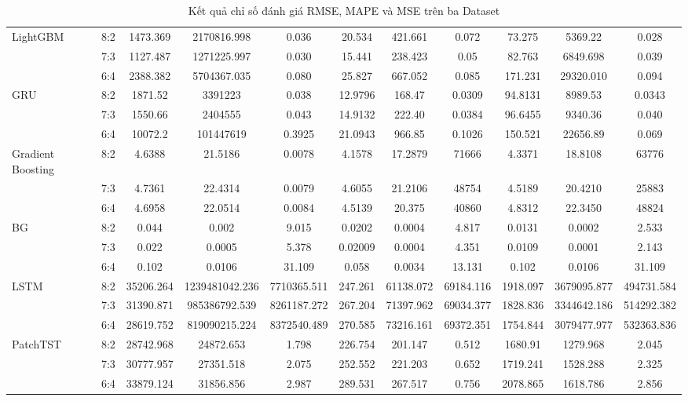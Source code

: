 \documentclass[conference]{IEEEtran}
\begin{document}
\begin{minipage}{1\textwidth}
\begin{table}[H]
\begin{tabular}{|l|c||c||c||c||c||c||c||c||c||c|}
\hline
LightGBM & 8:2 & 1473.369 & 2170816.998 & 0.036 & 20.534 & 421.661 & 0.072 & 73.275 & 5369.22 & 0.028  \\
    & 7:3 & 1127.487 & 1271225.997 & 0.030 & 15.441 & 238.423 & 0.05 & 82.763 & 6849.698 & 0.039  \\
    & 6:4 & 2388.382 & 5704367.035 & 0.080 & 25.827 & 667.052 & 0.085 & 171.231 & 29320.010 & 0.094  \\
\hline
GRU & 8:2 &1871.52  &3391223  &0.038 &12.9796 &168.47 &0.0309 &94.8131 &8989.53 &0.0343 \\
    & 7:3 &1550.66  &2404555  &0.043 &14.9132 &222.40 &0.0384 &96.6455 &9340.36 &0.040 \\
    & 6:4 &10072.2  &101447619  &0.3925 &21.0943 &966.85 &0.1026 &150.521 &22656.89 &0.069 \\
\hline
Gradient Boosting & 8:2 &4.6388  &21.5186  &0.0078 &4.1578 &17.2879 &71666 &4.3371 &18.8108 &63776 \\
    & 7:3 &4.7361  &22.4314  &0.0079 &4.6055 &21.2106 &48754 &4.5189 &20.4210 &25883 \\
     & 6:4 &4.6958  &22.0514  &0.0084 &4.5139 &20.375 &40860 &4.8312 &22.3450 &48824 \\
\hline
BG & 8:2 & 0.044 & 0.002 & 9.015 & 0.0202 & 0.0004 & 4.817 &  0.0131 & 0.0002& 2.533\\
    & 7:3 &  0.022 & 0.0005 & 5.378 &  0.02009 & 0.0004 & 4.351 & 0.0109 & 0.0001 & 2.143 \\
    & 6:4 & 0.102 & 0.0106 & 31.109 & 0.058 & 0.0034 & 13.131 & 0.102 & 0.0106 & 31.109 \\
\hline
LSTM & 8:2 & 35206.264 & 1239481042.236 & 7710365.511 & 247.261 & 61138.072 & 69184.116 & 1918.097 & 3679095.877 & 494731.584    \\
    & 7:3 & 31390.871 & 985386792.539 & 8261187.272 & 267.204 & 71397.962 & 69034.377 & 1828.836 & 3344642.186 & 514292.382   \\
    & 6:4 & 28619.752 & 819090215.224 & 8372540.489 & 270.585 & 73216.161 & 69372.351 & 1754.844 & 3079477.977 & 532363.836   \\
\hline
PatchTST & 8:2 & 28742.968 & 24872.653 & 1.798 & 226.754 & 201.147 & 0.512 & 1680.91 & 1279.968 & 2.045 \\
    & 7:3 & 30777.957 & 27351.518 & 2.075 & 252.552 & 221.203 & 0.652 & 1719.241 & 1528.288 & 2.325 \\
    & 6:4 & 33879.124 & 31856.856 & 2.987 & 289.531 & 267.517 & 0.756 & 2078.865 & 1618.786 & 2.856 \\
\hline
\end{tabular}
\caption{Kết quả chỉ số đánh giá RMSE, MAPE và MSE trên ba Dataset}
\end{table}    
\end{minipage}
\end{document}
